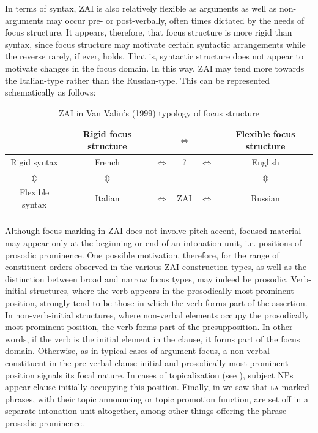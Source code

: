 In terms of syntax, ZAI is also relatively flexible as arguments as well as non-arguments may occur pre- or post-verbally, often times dictated by the needs of focus structure. It appears, therefore, that focus structure is more rigid than syntax, since focus structure may motivate certain syntactic arrangements while the reverse rarely, if ever, holds. That is, syntactic structure does not appear to motivate changes in the focus domain. In this way, ZAI may tend more towards the Italian-type rather than the Russian-type. This can be represented schematically as follows:

\begin{table}

\caption{\small{ZAI in Van Valin's (1999) typology of focus structure}}\label{zapfoctyp}
\begin{tabular}{c  c c c c  c}
\lsptoprule
& Rigid focus structure & & $\Leftrightarrow$ & & Flexible focus structure  \\

\midrule
Rigid syntax & French & $\Leftrightarrow$ & ? & $\Leftrightarrow$ & English \\
$\Updownarrow$ &  $\Updownarrow$ & & & & $\Updownarrow$ \\
Flexible syntax & Italian & $\Leftrightarrow$ & ZAI & $\Leftrightarrow$ & Russian \\

\lspbottomrule
\end{tabular}

\end{table}

Although focus marking in ZAI does not involve pitch accent, focused material may appear only at the beginning or end of an intonation unit, i.e. positions of prosodic prominence. One possible motivation, therefore, for the range of constituent orders observed in the various ZAI construction types, as well as the distinction between broad and narrow focus types, may indeed be prosodic. Verb-initial structures, where the verb appears in the prosodically most prominent position, strongly tend to be those in which the verb forms part of the assertion. In non-verb-initial structures, where non-verbal elements occupy the prosodically most prominent position, the verb forms part of the presupposition. In other words, if the verb is the initial element in the clause, it forms part of the focus domain. Otherwise, as in typical cases of argument focus, a non-verbal constituent in the pre-verbal clause-initial and prosodically most prominent position signals its focal nature. In cases of topicalization (see ), subject NPs appear clause-initially occupying this position. Finally, in  we saw that \textsc{la}-marked phrases, with their topic announcing or topic promotion function, are set off in a separate intonation unit altogether, among other things offering the phrase prosodic prominence. 



